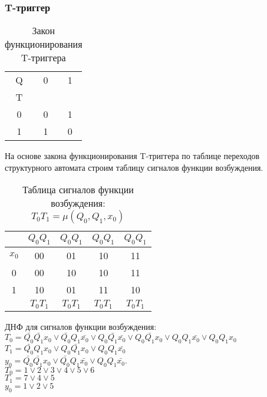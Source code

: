 \documentclass[a4paper,10pt]{article}
\begin{document}
\newpage
        \subsubsection*{T-триггер}
            \begin{table}[h!]
                \center
                \begin{tabular}{|c|c|c|}
                    \hline
                     Q & 0 & 1 \\
                     T &   &   \\ \hline
                     0 & 0 & 1 \\ \hline
                     1 & 1 & 0 \\ \hline
                \end{tabular}
                \caption{Закон функционирования T-триггера}
            \end{table}

            На основе закона функционирования T-триггера по таблице переходов структурного автомата
            строим таблицу сигналов функции возбуждения.

            \begin{table}[h!]
                \center
                \begin{tabular}{|c|c|c|c|c|}
                    \hline
                              &$Q_0Q_1$  &$Q_0Q_1$  &$Q_0Q_1$  &$Q_0Q_1$  \\ \hline
                     $x_0$    & 00       & 01       & 10       & 11 \\ \hline
                         0    & 00       & 10       & 10       & 11 \\ \hline 
                         1    & 10       & 01       & 11       & 10 \\ \hline
                              & $T_0T_1$ & $T_0T_1$ & $T_0T_1$ & $T_0T_1$ \\ \hline
                \end{tabular}
                \caption{Таблица сигналов функции возбуждения: $T_0T_1 = \mu(Q_0,Q_1,x_0)$}
            \end{table}

            ДНФ для сигналов функции возбуждения: \\
            $T_0 = \bar{Q_0} \bar{Q_1} x_0 \lor \bar{Q_0} Q_1 \bar{x_0} \lor Q_0 \bar{Q_1} \bar{x_0} \lor Q_0 \bar{Q_1} x_0 \lor Q_0 Q_1 \bar{x_0} \lor Q_0 Q_1 x_0 $ \\
            $T_1 = \bar{Q_0} Q_1 x_0 \lor Q_0 \bar{Q_1} x_0 \lor Q_0 Q_1 \bar{x_0}$ \\
            $y_0 = \bar{Q_0} \bar{Q_1} x_0 \lor \bar{Q_0} Q_1 \bar{x_0} \lor Q_0 Q_1 \bar{x_0}$. \\
			$T_0 = 1 \lor 2 \lor 3 \lor 4 \lor 5 \lor 6 $ \\
			$T_1 = 7 \lor 4 \lor 5$ \\
			$y_0 = 1 \lor 2 \lor 5$
\end{document}
